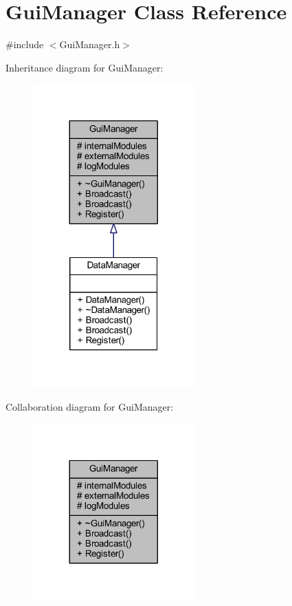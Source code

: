 \hypertarget{class_gui_manager}{}\section{Gui\+Manager Class Reference}
\label{class_gui_manager}


{\ttfamily \#include $<$Gui\+Manager.\+h$>$}



Inheritance diagram for Gui\+Manager\+:
\nopagebreak
\begin{figure}[H]
\begin{center}
\leavevmode
\includegraphics[width=176pt]{class_gui_manager__inherit__graph}
\end{center}
\end{figure}


Collaboration diagram for Gui\+Manager\+:
\nopagebreak
\begin{figure}[H]
\begin{center}
\leavevmode
\includegraphics[width=176pt]{class_gui_manager__coll__graph}
\end{center}
\end{figure}

